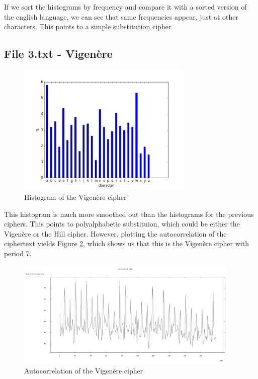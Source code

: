 \documentclass[a4paper]{article}
\begin{document}
        If we sort the histograms by frequency and compare it with a sorted version of the
        english language, we can see that same frequencies appear, just at other characters.
        This points to a simple substitution cipher.


    \subsection{File 3.txt - Vigenère}
        \begin{figure}[h!]
            \centering
            \includegraphics[width=0.75\textwidth]{histogram_3.png}
            \caption{Histogram of the Vigenère cipher}
            \label{fig:histogram3}
        \end{figure}


        This histogram is much more smoothed out than the histograms for the previous ciphers. This
        points to polyalphabetic substituion, which could be either the Vigenère or the Hill cipher.
        However, plotting the autocorrelation of the ciphertext yields Figure 
        \ref{fig:autocorrelation}, which shows us that this is the Vigenère cipher with period 7.

        \begin{figure}[h!]
            \centering
            \includegraphics[width=0.95\textwidth]{autocorrelation.png}
            \caption{Autocorrelation of the Vigenère cipher}
            \label{fig:autocorrelation}
        \end{figure}
\end{document}
